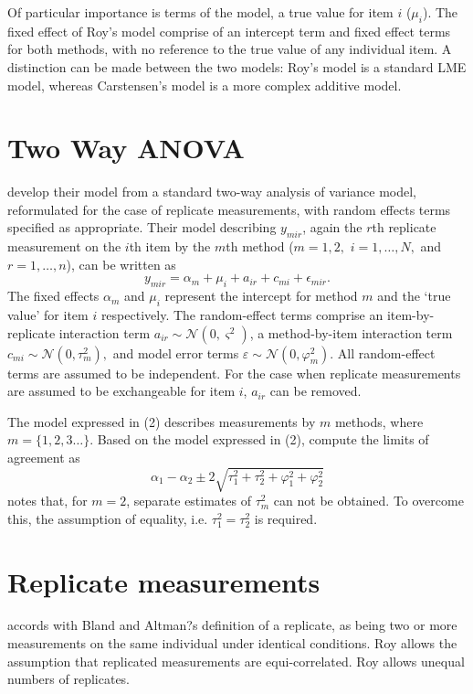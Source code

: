 \documentclass[12pt, a4paper]{report}
\theoremstyle{plain}
\theoremstyle{definition}
\theoremstyle{remark}
\begin{document}
	Of particular importance is terms of the model, a true value for item $i$ ($\mu_{i}$).  The fixed effect of Roy's model comprise of an intercept term and fixed effect terms for both methods, with no reference to the true value of any individual item. A distinction can be made between the two models: Roy's model is a standard LME model, whereas Carstensen's model is a more complex additive model.
	
	\bigskip
	
	
	\section{Two Way ANOVA}
	
	\citet{BXC2008} develop their model from a standard two-way analysis of variance model, reformulated for the case of replicate measurements, with random effects terms specified as appropriate. 
	Their model describing $y_{mir} $, again the $r$th replicate measurement on the $i$th item by the $m$th method ($m=1,2,$ $i=1,\ldots,N,$ and $r = 1,\ldots,n$), can be written as
	\begin{equation}\label{BXC-model}
		y_{mir}  = \alpha_{m} + \mu_{i} + a_{ir} + c_{mi} + \epsilon_{mir}.
	\end{equation}
	The fixed effects $\alpha_{m}$ and $\mu_{i}$  represent the intercept for method $m$ and the `true value' for item $i$ respectively. The random-effect terms comprise an item-by-replicate interaction term $a_{ir} \sim \mathcal{N}(0,\varsigma^{2})$, a method-by-item interaction term $c_{mi} \sim \mathcal{N}(0,\tau^{2}_{m}),$ and model error terms $\varepsilon \sim \mathcal{N}(0,\varphi^{2}_{m}).$ All random-effect terms are assumed to be independent.
	For the case when replicate measurements are assumed to be exchangeable for item $i$, $a_{ir}$ can be removed.
	
	The model expressed in (2) describes measurements by $m$ methods, where $m = \{1,2,3\ldots\}$. Based on the model expressed in (2), \citet{BXC2008} compute the limits of agreement as
	\[
	\alpha_1 - \alpha_2 \pm 2 \sqrt{ \tau^2_1 +  \tau^2_2 +  \varphi^2_1 +  \varphi^2_2 }
	\]
	\citet{BXC2008} notes that, for $m=2$,  separate estimates of $\tau^2_m$ can not be obtained. To overcome this, the assumption of equality, i.e. $\tau^2_1 = \tau^2_2$ is required.
	
	

	\section{Replicate measurements}
	\citet{ARoy2009} accords with Bland and Altman?s definition of a replicate, as being two or more measurements on the same individual under identical conditions.
	Roy allows the assumption that replicated measurements are equi-correlated.
	Roy allows unequal numbers of replicates.
\end{document}

